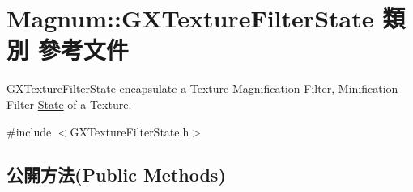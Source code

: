 \hypertarget{class_magnum_1_1_g_x_texture_filter_state}{}\section{Magnum\+:\+:G\+X\+Texture\+Filter\+State 類別 參考文件}
\label{class_magnum_1_1_g_x_texture_filter_state}


\hyperlink{class_magnum_1_1_g_x_texture_filter_state}{G\+X\+Texture\+Filter\+State} encapsulate a Texture Magnification Filter, Minification Filter \hyperlink{class_magnum_1_1_state}{State} of a Texture.  




{\ttfamily \#include $<$G\+X\+Texture\+Filter\+State.\+h$>$}

\subsection*{公開方法(Public Methods)}
